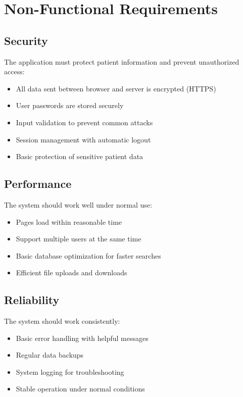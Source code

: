 \documentclass[12pt,a4paper]{article}
\newcommand{\sectionbreak}{\vspace{0.5cm}}
\begin{document}
\sectionbreak

\section{Non-Functional Requirements}

\subsection{Security}

The application must protect patient information and prevent unauthorized access:

\begin{itemize}[itemsep=0.1cm]
    \item All data sent between browser and server is encrypted (HTTPS)
    \item User passwords are stored securely
    \item Input validation to prevent common attacks
    \item Session management with automatic logout
    \item Basic protection of sensitive patient data
\end{itemize}

\subsection{Performance}

The system should work well under normal use:

\begin{itemize}[itemsep=0.1cm]
    \item Pages load within reasonable time
    \item Support multiple users at the same time
    \item Basic database optimization for faster searches
    \item Efficient file uploads and downloads
\end{itemize}

\subsection{Reliability}

The system should work consistently:

\begin{itemize}[itemsep=0.1cm]
    \item Basic error handling with helpful messages
    \item Regular data backups
    \item System logging for troubleshooting
    \item Stable operation under normal conditions
\end{itemize}
\end{document}
